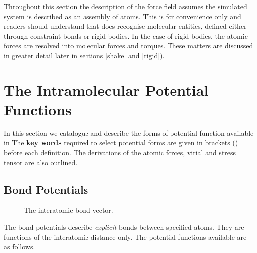 Throughout this section the description of the force field assumes the simulated system is described as an assembly of
atoms. This is for convenience only and readers should understand that
\D{} does recognise molecular entities, defined either through
constraint bonds or rigid bodies. In the case
of rigid bodies, the atomic forces are resolved into molecular forces
and torques. These matters are discussed in greater detail later in
sections \ref{shake} and \ref{rigid}).

\section{The Intramolecular Potential Functions}
\label{intramolecular}
In this section we catalogue and describe the forms of potential
function available in \D{}  The {\bf key words} required to select
potential forms are given in brackets () before each definition. The
derivations of the atomic forces, virial and stress tensor are also
outlined.

\subsection{Bond Potentials}

\begin{figure}[ht]
\begin{center}
\centerline{}
\caption{The interatomic bond vector.}
\end{center}
\end{figure}

The bond potentials describe {\em explicit} bonds between specified
atoms. They are functions of the interatomic distance only. The
potential functions available are as follows.

